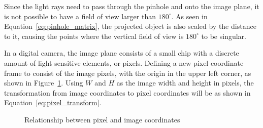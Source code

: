 Since the light rays need to pass through the pinhole and onto the image plane, it is not possible to have a field of view larger than $180^\circ$. As seen in Equation~\eqref{eq:pinhole_matrix}, the projected object is also scaled by the distance to it, causing the points where the vertical field of view is $180^\circ$ to be singular. 

In a digital camera, the image plane consists of a small chip with a discrete amount of light sensitive elements, or pixels. Defining a new pixel coordinate frame to consist of the image pixels, with the origin in the upper left corner, as shown in Figure~\ref{fig:rel_img_pixel}. Using $W$ and $H$ as the image width and height in pixels, the transformation from image coordinates to pixel coordinates will be as shown in Equation~\eqref{eq:pixel_transform}.

\begin{figure}[!htb]
    \centering
    
    \caption{Relationship between pixel and image coordinates}
    \label{fig:rel_img_pixel}
\end{figure}

